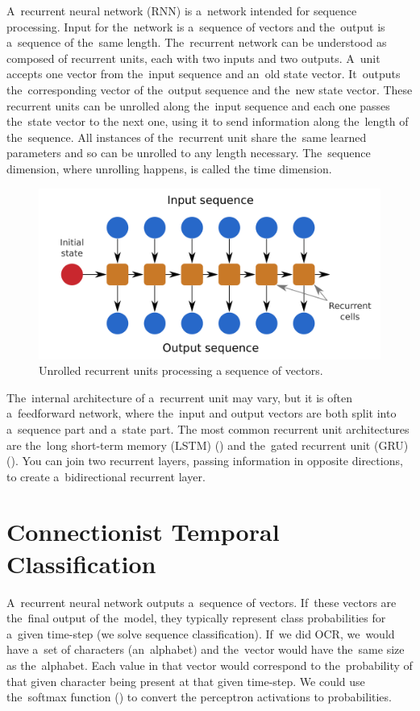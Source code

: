 A~recurrent neural network (RNN) is a~network intended for sequence processing. Input for the~network is a~sequence of vectors and the~output is a~sequence of the~same length. The~recurrent network can be understood as composed of recurrent units, each with two inputs and two outputs. A~unit accepts one vector from the~input sequence and an~old state vector. It~outputs the~corresponding vector of the~output sequence and the~new state vector. These recurrent units can be unrolled along the~input sequence and each one passes the~state vector to the next one, using it to send information along the~length of the~sequence. All instances of the~recurrent unit share the~same learned parameters and so can be unrolled to any length necessary. The~sequence dimension, where unrolling happens, is called the time dimension.

\begin{figure}[h]
    \centering
    \includegraphics[width=140mm]{../img/recurrent-network}
    \caption{Unrolled recurrent units processing a sequence of vectors.}
    \label{fig3:RecurrentNetwork}
\end{figure}

The~internal architecture of a~recurrent unit may vary, but it is often a~feedforward network, where the~input and output vectors are both split into a~sequence part and a~state part. The most common recurrent unit architectures are the~long short-term memory (LSTM) (\cite{LSTM}) and the~gated recurrent unit (GRU) (\cite{GRU}). You can join two recurrent layers, passing information in opposite directions, to create a~bidirectional recurrent layer.


\section{Connectionist Temporal Classification}

A~recurrent neural network outputs a~sequence of vectors. If~these vectors are the~final output of the~model, they typically represent class probabilities for a~given time-step (we solve sequence classification). If~we did OCR, we~would have a~set of characters (an~alphabet) and the~vector would have the~same size as the~alphabet. Each value in that vector would correspond to the~probability of that given character being present at that given time-step. We could use the~softmax function (\cite{Goodfellow-et-al-2016}) to convert the perceptron activations to probabilities.

